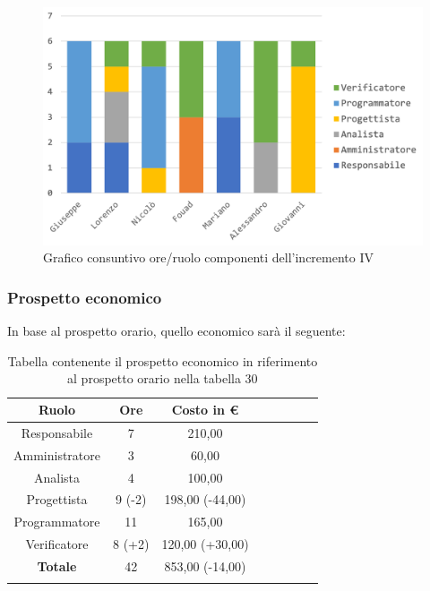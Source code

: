 			\begin{figure}[H]
				\centering
				\includegraphics[width=0.8\linewidth]{images/consuntivo/ConsIncr4-1.png}
				\caption{Grafico consuntivo ore/ruolo componenti dell'incremento IV}
				\label{fig:consuntivo grafico suddivione ruoli incremento IV}
			\end{figure}
			
		\subsubsection{Prospetto economico}
			In base al prospetto orario, quello economico sarà il seguente: 
			
			\begin{longtable}{|c|c|c|c|c|c|c|c}
				\hline
				\rowcolor{lighter-grayer}
				\textbf{Ruolo} & \textbf{Ore} & \textbf{Costo in €} \\
				\hline
				\endfirsthead
				\hline
			Responsabile 	    & 7 & 210,00\\
			\hline 
			\hline
			Amministratore	  & 3 & 60,00\\
			\hline
			\hline
			Analista 				& 4 & 100,00\\
			\hline
			\hline
			Progettista 		  & 9 (-2) & 198,00 (-44,00)\\
			\hline
			\hline
			Programmatore 	 & 11 & 165,00\\
			\hline
			\hline
			Verificatore 		  & 8 (+2) & 120,00 (+30,00) \\
			\hline
			\textbf{Totale} 	& 42 & 853,00 (-14,00)\\
			\hline
				
				\caption{Tabella contenente il prospetto economico in riferimento al prospetto orario nella tabella 30}
			\end{longtable}
			\pagebreak
			
